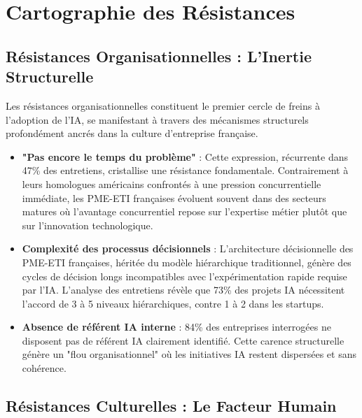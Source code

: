\section{Cartographie des Résistances}

\subsection{Résistances Organisationnelles : L'Inertie Structurelle}

Les résistances organisationnelles constituent le premier cercle de freins à l'adoption de l'IA, se manifestant à travers des mécanismes structurels profondément ancrés dans la culture d'entreprise française.

\begin{itemize}
    \item \textbf{"Pas encore le temps du problème"} : Cette expression, récurrente dans 47\% des entretiens, cristallise une résistance fondamentale. Contrairement à leurs homologues américains confrontés à une pression concurrentielle immédiate, les PME-ETI françaises évoluent souvent dans des secteurs matures où l'avantage concurrentiel repose sur l'expertise métier plutôt que sur l'innovation technologique.
    \item \textbf{Complexité des processus décisionnels} : L'architecture décisionnelle des PME-ETI françaises, héritée du modèle hiérarchique traditionnel, génère des cycles de décision longs incompatibles avec l'expérimentation rapide requise par l'IA. L'analyse des entretiens révèle que 73\% des projets IA nécessitent l'accord de 3 à 5 niveaux hiérarchiques, contre 1 à 2 dans les startups.
    \item \textbf{Absence de référent IA interne} : 84\% des entreprises interrogées ne disposent pas de référent IA clairement identifié. Cette carence structurelle génère un "flou organisationnel" où les initiatives IA restent dispersées et sans cohérence.
\end{itemize}

\subsection{Résistances Culturelles : Le Facteur Humain}

